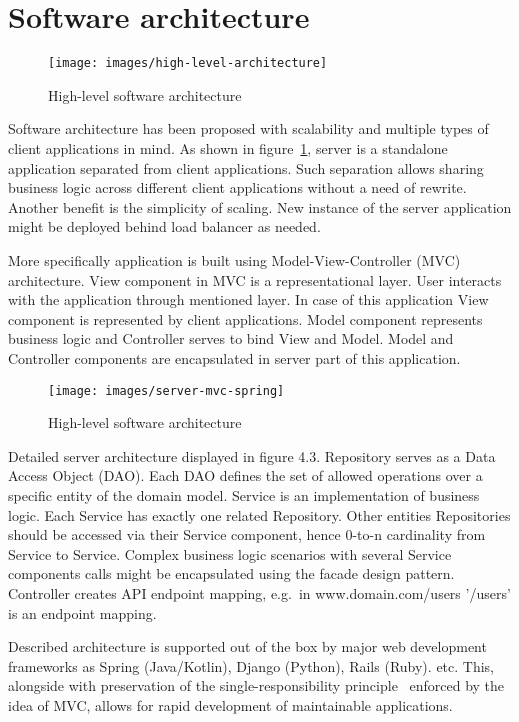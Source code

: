 
\section{Software architecture}\label{sec:software-architecture}

\begin{figure}[h!]
    \texttt{[image: images/high-level-architecture]}
    \caption{High-level software architecture}
    \label{fig:high-level-architecture}
\end{figure}

Software architecture has been proposed with scalability and multiple types of client applications in mind.
As shown in figure~\ref{fig:high-level-architecture}, server is a standalone application separated from client applications.
Such separation allows sharing business logic across different client applications without a need of rewrite.
Another benefit is the simplicity of scaling.
New instance of the server application might be deployed behind load balancer as needed.

More specifically application is built using Model-View-Controller (MVC) architecture.\cite{wiki-mvc}
View component in MVC is a representational layer.
User interacts with the application through mentioned layer.
In case of this application View component is represented by client applications.
Model component represents business logic and Controller serves to bind View and Model.
Model and Controller components are encapsulated in server part of this application.

\begin{figure}[h!]
    \texttt{[image: images/server-mvc-spring]}
    \caption{High-level software architecture}
    \label{fig:server-mvc-spring}
\end{figure}

Detailed server architecture displayed in figure 4.3.
Repository serves as a Data Access Object (DAO).
Each DAO defines the set of allowed operations over a specific entity of the domain model.
Service is an implementation of business logic.
Each Service has exactly one related Repository.
Other entities Repositories should be accessed via their Service component, hence 0-to-n cardinality from Service to Service.
Complex business logic scenarios with several Service components calls might be encapsulated using the facade design pattern.
Controller creates API endpoint mapping, e.g.\ in www.domain.com/users '/users' is an endpoint mapping.

Described architecture is supported out of the box by major web development frameworks as Spring (Java/Kotlin), Django (Python), Rails (Ruby).\cite{spring,django,ruby} etc.
This, alongside with preservation of the single-responsibility principle~\cite{wiki-srp} enforced by the idea of MVC, allows for rapid development of maintainable applications.